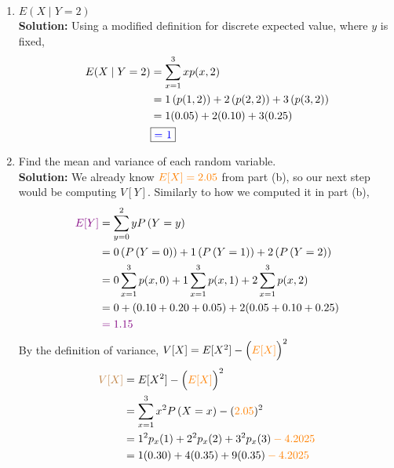 \documentclass[12pt]{article}
\newcommand{\pars}[1]{\left( {#1} \right) }
\newcommand{\prob}[1]{P \left( {#1} \right) }
\begin{document}
\begin{enumerate}
\begin{enumerate}
        \item $E(X \mid Y=2)$
                \vspace{0.15in}\\
        \textbf{Solution:} Using a modified definition for discrete expected value, where $y$ is fixed,
        \begin{align}
            E(X \mid Y=2) &= \sum_{x=1}^3 x p(x,2)\notag\\
            &= 1\pars{p(1,2)} + 2\pars{p(2,2)} + 3\pars{p(3,2)} \notag \\
            &= 1(0.05) + 2(0.10) + 3(0.25)\notag\\
            & \fbox{\color{blue} = 1}\notag
        \end{align}
        \vspace{0.15in}
        \item Find the mean and variance of each random variable.
                        \vspace{0.15in}\\
        \textbf{Solution:} We already know $\color{orange}E[X] = 2.05\color{black}$ from part (b), so our next step would be computing $V[Y]$. Similarly to how we computed it in part (b),\\
        \begin{align}
            \color{violet} E[Y] \color{black} &= \sum_{y=0}^2 y \prob{Y=y} \notag\\
            &= 0\pars{  \prob{Y=0}} + 1\pars{\prob{Y=1}} + 2\pars{\prob{Y=2}} \notag \\
            &= 0 \sum_{x=1}^3 p(x,0) + 1 \sum_{x=1}^3 p(x,1) + 2 \sum_{x=1}^3 p(x,2) \notag\\
            &= 0 + (0.10 + 0.20 + 0.05) + 2(0.05 + 0.10 + 0.25) \notag\\
            & \color{violet} = 1.15\notag
        \end{align}
        By the definition of variance, $V[X] = E[X^2] - \Big(\color{orange}E[X]\color{black}\Big)^2$
        \begin{align}
            \color{brown} V[X] \color{black} &= E[X^2] - \Big(\color{orange}E[X]\color{black}\Big)^2\notag\\
            &= \sum_{x=1}^3 x^2 \prob{X=x} - (\color{orange}2.05\color{black})^2 \notag\\
            &= 1^2 p_x(1) + 2^2 p_x(2) + 3^2 p_x(3) \color{orange}- 4.2025\color{black} \notag\\
            &= 1(0.30) + 4(0.35) + 9(0.35) \color{orange}- 4.2025\color{black} \notag\\

\end{align}
\end{enumerate}
\end{enumerate}
\end{document}
